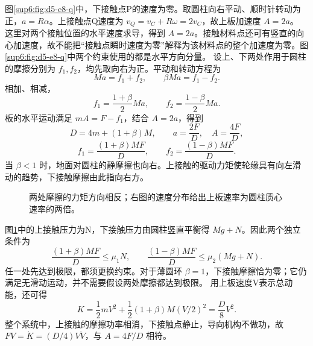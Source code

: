 \begin{solution}
图\ref{sup6:fig:d5-e8-q}中，下接触点P的速度为零。取圆柱向右平动、顺时针转动为正，$a=R\alpha$。上接触点Q速度为 $v_Q=v_C+R\omega=2v_C$，故上板加速度 $A=2a$。
这里对两个接触位置的水平速度求导，得到 $A=2a$。接触材料点还可有竖直的向心加速度，故不能把“接触点瞬时速度为零”解释为该材料点的整个加速度为零。图\ref{sup6:fig:d5-e8-q}中两个约束使用的都是水平方向分量。
设上、下两处作用于圆柱的摩擦分别为 $f_1,f_2$，均先取向右为正。平动和转动方程为
\[
Ma=f_1+f_2,\qquad \beta Ma=f_1-f_2.
\]
相加、相减，
\[
f_1=\frac{1+\beta}{2}Ma,\qquad
f_2=\frac{1-\beta}{2}Ma.
\]
板的水平运动满足 $mA=F-f_1$，结合 $A=2a$，得到
\[
D=4m+(1+\beta)M,\qquad a=\frac{2F}D,\quad A=\frac{4F}D,
\]
\[
f_1=\frac{(1+\beta)MF}D,\qquad
f_2=\frac{(1-\beta)MF}D.
\]
当 $\beta<1$ 时，地面对圆柱的静摩擦也向右。上接触的驱动力矩使轮缘具有向左滑动的趋势，下接触摩擦由此指向右方。
\begin{figure}[H]\centering
{}
\caption{两处摩擦的力矩方向相反；右图的速度分布给出上板速率为圆柱质心速率的两倍。}\label{sup6:fig:d5-e8-s}
\end{figure}
图\ref{sup6:fig:d5-e8-s}中的上接触压力为N，下接触压力由圆柱竖直平衡得 $Mg+N$。因此两个独立条件为
\[
\frac{(1+\beta)MF}D\le\mu_1N,\qquad
\frac{(1-\beta)MF}D\le\mu_2(Mg+N).
\]
任一处先达到极限，都须更换约束。对于薄圆环 $\beta=1$，下接触摩擦恰为零；它仍满足无滑动运动，并不需要假设两处摩擦都达到极限。
用上板速度V表示总动能，还可得
\[
K=\frac12mV^2+\frac12(1+\beta)M(V/2)^2=\frac D8V^2.
\]
整个系统中，上接触的摩擦功率相消，下接触点静止，导向机构不做功，故 $FV=\dot K=(D/4)V\dot V$，与 $A=4F/D$ 相符。
\end{solution}



